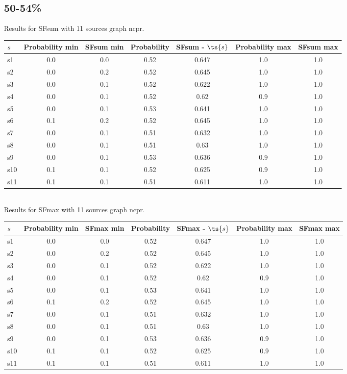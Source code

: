 \documentclass{article}
\begin{document}
\newpage

\subsection{50-54\%}

\noindent Results for SFsum with 11 sources graph ncpr.

\noindent\begin{tabular}{|l|c|c|c|c|c|c|}
\hline
$s$& Probability min & SFsum min & Probability & SFsum - $\ts{s}$ & Probability max & SFsum max\\
\hline
s1 &0.0 & 0.0 & 0.52 & 0.647 & 1.0 & 1.0\\
\hline
s2 &0.0 & 0.2 & 0.52 & 0.645 & 1.0 & 1.0\\
\hline
s3 &0.0 & 0.1 & 0.52 & 0.622 & 1.0 & 1.0\\
\hline
s4 &0.0 & 0.1 & 0.52 & 0.62 & 0.9 & 1.0\\
\hline
s5 &0.0 & 0.1 & 0.53 & 0.641 & 1.0 & 1.0\\
\hline
s6 &0.1 & 0.2 & 0.52 & 0.645 & 1.0 & 1.0\\
\hline
s7 &0.0 & 0.1 & 0.51 & 0.632 & 1.0 & 1.0\\
\hline
s8 &0.0 & 0.1 & 0.51 & 0.63 & 1.0 & 1.0\\
\hline
s9 &0.0 & 0.1 & 0.53 & 0.636 & 0.9 & 1.0\\
\hline
s10 &0.1 & 0.1 & 0.52 & 0.625 & 0.9 & 1.0\\
\hline
s11 &0.1 & 0.1 & 0.51 & 0.611 & 1.0 & 1.0\\
\hline
\end{tabular}\\

\noindent Results for SFmax with 11 sources graph ncpr.

\noindent\begin{tabular}{|l|c|c|c|c|c|c|}
\hline
$s$& Probability min & SFmax min & Probability & SFmax - $\ts{s}$ & Probability max & SFmax max\\
\hline
s1 &0.0 & 0.0 & 0.52 & 0.647 & 1.0 & 1.0\\
\hline
s2 &0.0 & 0.2 & 0.52 & 0.645 & 1.0 & 1.0\\
\hline
s3 &0.0 & 0.1 & 0.52 & 0.622 & 1.0 & 1.0\\
\hline
s4 &0.0 & 0.1 & 0.52 & 0.62 & 0.9 & 1.0\\
\hline
s5 &0.0 & 0.1 & 0.53 & 0.641 & 1.0 & 1.0\\
\hline
s6 &0.1 & 0.2 & 0.52 & 0.645 & 1.0 & 1.0\\
\hline
s7 &0.0 & 0.1 & 0.51 & 0.632 & 1.0 & 1.0\\
\hline
s8 &0.0 & 0.1 & 0.51 & 0.63 & 1.0 & 1.0\\
\hline
s9 &0.0 & 0.1 & 0.53 & 0.636 & 0.9 & 1.0\\
\hline
s10 &0.1 & 0.1 & 0.52 & 0.625 & 0.9 & 1.0\\
\hline
s11 &0.1 & 0.1 & 0.51 & 0.611 & 1.0 & 1.0\\
\hline
\end{tabular}\\
\end{document}

